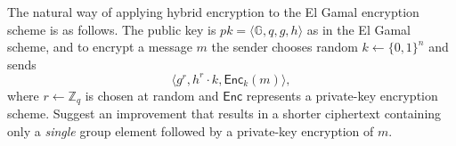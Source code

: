 \documentclass[12pt,letterpaper,boxed]{amspset}
\begin{document}







\begin{problem}[10.6]
The natural way of applying hybrid encryption to the El Gamal encryption scheme is as follows. The public key is $pk = \langle \mathbb{G},q,g,h\rangle $ as in the El Gamal scheme, and to encrypt a message $m$ the sender chooses random $k \gets \{0,1\}^n$ and sends
\[ \langle g^r, h^r\cdot k, \mathsf{Enc}_k(m)\rangle, \]
where $r\gets \mathbb{Z}_q$ is chosen at random and $\mathsf{Enc}$ represents a private-key encryption scheme. Suggest an improvement that results in a shorter ciphertext containing only a \emph{single} group element followed by a private-key encryption of $m$.
\end{problem}

\begin{solution}
\vspace{5cm}

\end{solution}
\end{document}
